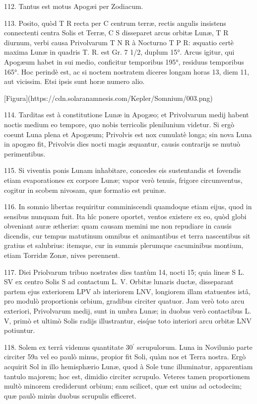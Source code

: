 \documentclass[a4paper, 11pt, oneside, polutonikogreek, german]{article}
\begin{document}
112. Tantus est motus Apogæi per Zodiacum.

113. Posito, quòd T R recta per C centrum terræ, rectis angulis insistens connectenti centra Solis et Terræ, C S disseparet arcus orbitæ Lunæ, T R diurnum, verbi causa Privolvarum T N R à Nocturno T P R: æquatio certè maxima Lunæ in quadris T. R. est Gr. 7 1/2, duplum 15°. Arcus igitur, qui Apogæum habet in sui medio, conficitur temporibus 195°, residuus temporibus 165°. Hoc perindè est, ac si noctem nostratem diceres longam horas 13, diem 11, aut vicissim. Etsi ipsis sunt horæ numero alio.

[Figura](https://cdn.solaranamnesis.com/Kepler/Somnium/003.png)

114. Tarditas est à constitutione Lunæ in Apogæo; et Privolvarum medij habent noctis medium eo tempore, quo nobis terricolis plenilunium videtur. Si ergò coeunt Luna plena et Apogæum; Privolvis est nox cumulatè longa; sin nova Luna in apogæo fit, Privolvis dies nocti magis æquantur, causis contrarijs se mutuò perimentibus.

115. Si viventia ponis Lunam inhabitare, concedes eis sustentandis et fovendis etiam evaporationes ex corpore Lunæ; vapor verò tenuis, frigore circumventus, cogitur in scobem nivosam, quæ formatio est pruinæ.

116. In somnio libertas requiritur comminiscendi quamdoque etiam eijus, quod in sensibus nunquam fuit. Ita hîc ponere oportet, ventos existere ex eo, quòd globi obveniant auræ ætheriæ: quam causam memini me non repudiare in causis dicendis, cur tempus matutinum omnibus et animantibus et terra nascentibus sit gratius et salubrius: itemque, cur in summis plerumque cacuminibus montium, etiam Torridæ Zonæ, nives perennent.

117. Diei Priolvarum tribuo nostrates dies tantùm 14, nocti 15; quia lineæ S L. SV ex centro Solis S ad contactum L. V. Orbitæ lunaris ductæ, disseparant partem ejus exteriorem LPV ab interiorem LNV, longiorem illam statuentes istâ, pro modulò proportionis orbium, gradibus circiter quatuor. Jam verò toto arcu exteriori, Privolvarum medij, sunt in umbra Lunæ; in duobus verò contactibus L. V, primò et ultimò Solis radijs illustrantur, eis\'que toto interiori arcu orbitæ LNV potiuntur.

118. Solem ex terrâ videmus quantitate 30$^{\prime}$ scrupulorum. Luna in Novilunio parte circiter 59a vel eo paulò minus, propior fit Soli, quàm nos et Terra nostra. Ergò acquirit Sol in illo hemisphærio Lunæ, quod à Sole tunc illuminatur, apparentiam tantulo majorem; hoc est, dimidio circiter scrupulo. Veteres tamen proportionem multò minorem crediderunt orbium; eam scilicet, quæ est unius ad octodecim; quæ paulò minùs duobus scrupulis efficeret.
\end{document}
